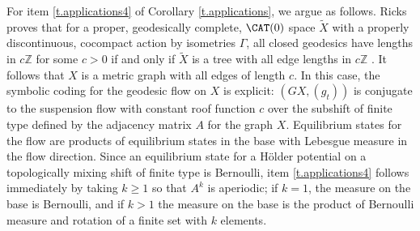 For item \eqref{t.applications4} of Corollary \ref{t.applications}, we argue as follows. Ricks proves that for a proper, geodesically complete, $\CAT(0)$ space $\tilde X$ with a properly discontinuous, cocompact action by isometries $\Gamma$, all closed geodesics have lengths in $c\mathbb{Z}$ for some $c>0$ if and only if $\tilde X$ is a tree with all edge lengths in $c\mathbb{Z}$ \cite[Th.\,4]{ricks}. It follows that $X$ is a metric graph with all edges of length $c$. In this case, the symbolic coding for the geodesic flow on $X$ is explicit: $(GX, (g_t))$ is conjugate to the suspension flow with constant roof function $c$ over the subshift of finite type defined by the adjacency matrix $A$ for the graph $X$. Equilibrium states for the flow are products of equilibrium states in the base with Lebesgue measure in the flow direction. Since an equilibrium state for a Hölder potential on a topologically mixing shift of finite type is Bernoulli, item \eqref{t.applications4} follows immediately by taking $k\geq 1$ so that $A^k$ is aperiodic; if $k=1$, the measure on the base is Bernoulli, and if $k>1$ the measure on the base is the product of Bernoulli measure and rotation of a finite set with $k$ elements.

\Changelback
